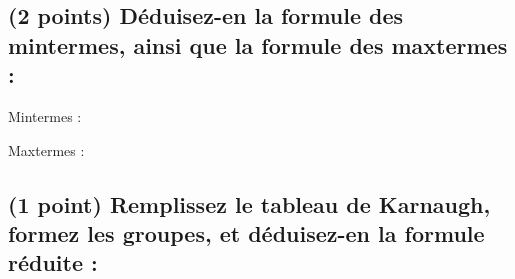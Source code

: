 \documentclass[11pt,a4paper]{article}
\begin{document}
\begin{table}[!ht]
\begin{minipage}{0.50\textwidth}
  \end{minipage}
  \hfillx
  \begin{minipage}{0.50\textwidth}

\subsection{(2 points) Déduisez-en la formule des mintermes, ainsi que la formule des maxtermes : }

\bigskip

Mintermes :

\vspace*{3cm}


\bigskip

Maxtermes :

\vspace*{11.44cm}


  \end{minipage}
\end{table}

\vspace*{-0.5cm}

\subsection{(1 point) Remplissez le tableau de Karnaugh, formez les groupes, et déduisez-en la formule réduite : }
\end{document}
